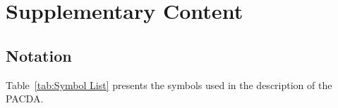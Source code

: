 \documentclass[conference,compsoc]{IEEEtran} %
\begin{document}
		\appendices
		\section{Supplementary Content}

\subsection{Notation}
\label{Sec:Notation}
Table~\ref{tab:Symbol List} presents the symbols used in the description of the PACDA.

\end{document}
